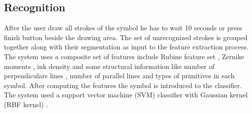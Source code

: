 \documentclass[a4paper,10pt]{IEEEconf}
\begin{document}
\subsection{Recognition}
After the user draw all strokes of the symbol he has to wait 10 seconds or press finish button beside the drawing area. The set of unrecognized strokes is grouped together along with their segmentation as input to the feature extraction process. The system uses a composite set of features include Rubine feature set \cite{gestureexample12}, Zernike moments \cite{HeloiseBeautification}, ink density \cite{GeometryAndDomain102} and some structural information like number of perpendiculars lines , number of parallel lines and types of primitives in each symbol. After computing the features the symbol is introduced to the classifier. The system used a support vector machine (SVM) classifier with Gaussian kernel (RBF kernel) \cite{libsvm}.\\%
%
\end{document}
